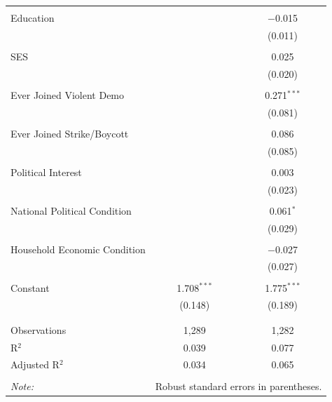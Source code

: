 \begin{table}[!htbp]
\begin{tabular}{@{\extracolsep{5pt}}lcc}
  & & \\ 
 Education &  & $-$0.015 \\ 
  &  & (0.011) \\ 
  & & \\ 
 SES &  & 0.025 \\ 
  &  & (0.020) \\ 
  & & \\ 
 Ever Joined Violent Demo &  & 0.271$^{***}$ \\ 
  &  & (0.081) \\ 
  & & \\ 
 Ever Joined Strike/Boycott &  & 0.086 \\ 
  &  & (0.085) \\ 
  & & \\ 
 Political Interest &  & 0.003 \\ 
  &  & (0.023) \\ 
  & & \\ 
 National Political Condition &  & 0.061$^{*}$ \\ 
  &  & (0.029) \\ 
  & & \\ 
 Household Economic Condition &  & $-$0.027 \\ 
  &  & (0.027) \\ 
  & & \\ 
 Constant & 1.708$^{***}$ & 1.775$^{***}$ \\ 
  & (0.148) & (0.189) \\ 
  & & \\ 
\hline \\[-1.8ex] 
Observations & 1,289 & 1,282 \\ 
R$^{2}$ & 0.039 & 0.077 \\ 
Adjusted R$^{2}$ & 0.034 & 0.065 \\ 
\hline 
\hline \\[-1.8ex] 
\textit{Note:}  & \multicolumn{2}{r}{Robust standard errors in parentheses.} \\ 
\end{tabular} 
\end{table} 
